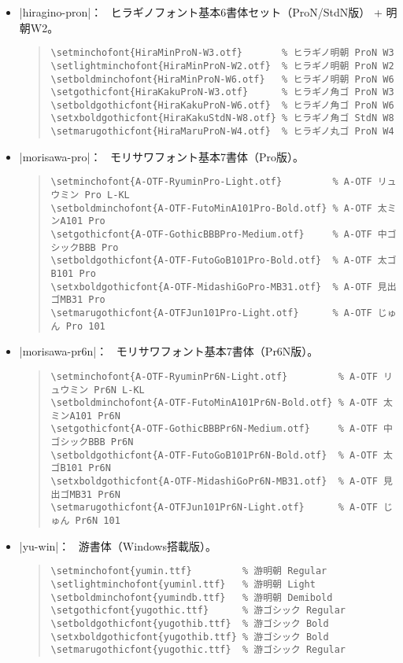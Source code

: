 \documentclass[a4paper,uplatex]{jsarticle}
\newcommand{\Means}{：\ }
\begin{document}
\begin{itemize}
\item |hiragino-pron|\Means
  ヒラギノフォント基本6書体セット（ProN/StdN版） + 明朝W2。
\begin{quote}\small\begin{verbatim}
\setminchofont{HiraMinProN-W3.otf}       % ヒラギノ明朝 ProN W3
\setlightminchofont{HiraMinProN-W2.otf}  % ヒラギノ明朝 ProN W2
\setboldminchofont{HiraMinProN-W6.otf}   % ヒラギノ明朝 ProN W6
\setgothicfont{HiraKakuProN-W3.otf}      % ヒラギノ角ゴ ProN W3
\setboldgothicfont{HiraKakuProN-W6.otf}  % ヒラギノ角ゴ ProN W6
\setxboldgothicfont{HiraKakuStdN-W8.otf} % ヒラギノ角ゴ StdN W8
\setmarugothicfont{HiraMaruProN-W4.otf}  % ヒラギノ丸ゴ ProN W4
\end{verbatim}\end{quote}

\item |morisawa-pro|\Means
  モリサワフォント基本7書体（Pro版）。
\begin{quote}\small\begin{verbatim}
\setminchofont{A-OTF-RyuminPro-Light.otf}         % A-OTF リュウミン Pro L-KL
\setboldminchofont{A-OTF-FutoMinA101Pro-Bold.otf} % A-OTF 太ミンA101 Pro
\setgothicfont{A-OTF-GothicBBBPro-Medium.otf}     % A-OTF 中ゴシックBBB Pro
\setboldgothicfont{A-OTF-FutoGoB101Pro-Bold.otf}  % A-OTF 太ゴB101 Pro
\setxboldgothicfont{A-OTF-MidashiGoPro-MB31.otf}  % A-OTF 見出ゴMB31 Pro
\setmarugothicfont{A-OTFJun101Pro-Light.otf}      % A-OTF じゅん Pro 101
\end{verbatim}\end{quote}

\item |morisawa-pr6n|\Means
  モリサワフォント基本7書体（Pr6N版）。
\begin{quote}\small\begin{verbatim}
\setminchofont{A-OTF-RyuminPr6N-Light.otf}         % A-OTF リュウミン Pr6N L-KL
\setboldminchofont{A-OTF-FutoMinA101Pr6N-Bold.otf} % A-OTF 太ミンA101 Pr6N
\setgothicfont{A-OTF-GothicBBBPr6N-Medium.otf}     % A-OTF 中ゴシックBBB Pr6N
\setboldgothicfont{A-OTF-FutoGoB101Pr6N-Bold.otf}  % A-OTF 太ゴB101 Pr6N
\setxboldgothicfont{A-OTF-MidashiGoPr6N-MB31.otf}  % A-OTF 見出ゴMB31 Pr6N
\setmarugothicfont{A-OTFJun101Pr6N-Light.otf}      % A-OTF じゅん Pr6N 101
\end{verbatim}\end{quote}

\item |yu-win|\Means
  游書体（Windows搭載版）。
\begin{quote}\small\begin{verbatim}
\setminchofont{yumin.ttf}         % 游明朝 Regular
\setlightminchofont{yuminl.ttf}   % 游明朝 Light
\setboldminchofont{yumindb.ttf}   % 游明朝 Demibold
\setgothicfont{yugothic.ttf}      % 游ゴシック Regular
\setboldgothicfont{yugothib.ttf}  % 游ゴシック Bold
\setxboldgothicfont{yugothib.ttf} % 游ゴシック Bold
\setmarugothicfont{yugothic.ttf}  % 游ゴシック Regular
\end{verbatim}\end{quote}


\end{itemize}
\end{document}
